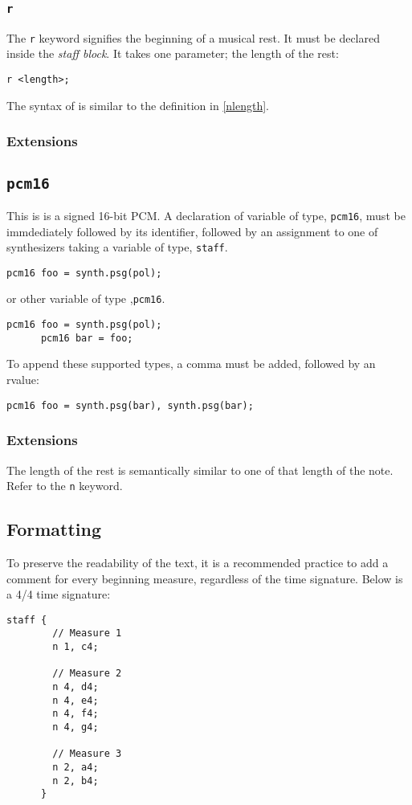 \subsubsection{\texttt{r}}

\np The \verb+r+ keyword signifies the beginning of a musical rest. It must be
declared inside the \textit{staff block}. It takes one parameter; the
length of the rest:

\begin{Verbatim}[frame=single]
      r <length>;
\end{Verbatim}

\np The syntax of  is similar to the definition in 
\autoref{nlength}.

\subsubsection{Extensions}

\subsection{\texttt{pcm16}}
\np This is is a signed 16-bit PCM. A declaration of variable of type,
\verb+pcm16+, must be immdediately followed by its identifier, followed by
an assignment to one of synthesizers taking a variable of type, \verb+staff+. 
\begin{Verbatim}[frame=single]
       pcm16 foo = synth.psg(pol);
\end{Verbatim}

or other variable of type ,\verb+pcm16+.
\begin{Verbatim}[frame=single]
      pcm16 foo = synth.psg(pol);
      pcm16 bar = foo;
\end{Verbatim}

\np To append these supported types, a comma must be added, followed by an rvalue:
\begin{Verbatim}[frame=single]
      pcm16 foo = synth.psg(bar), synth.psg(bar);
\end{Verbatim}


\subsubsection{Extensions}

\np The length of the rest is semantically similar to one of that length
of the note. Refer to the \verb+n+ keyword.

\subsection{Formatting}
\label{formatting}
\np To preserve the readability of the text, it is a recommended practice to add a comment for every
beginning measure, regardless of the time signature. Below is a 4/4 time signature:
\begin{Verbatim}[frame=single]
      staff {
        // Measure 1
        n 1, c4;
  
        // Measure 2
        n 4, d4;
        n 4, e4;
        n 4, f4;
        n 4, g4;
  
        // Measure 3
        n 2, a4;
        n 2, b4;
      }
\end{Verbatim}


